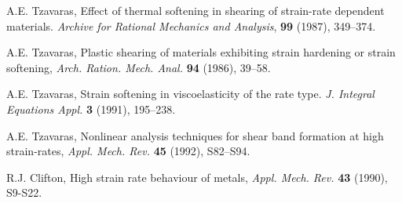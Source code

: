 \documentclass[a4paper,11pt]{article}
\begin{document}
\begin{thebibliography}{10}
{\sc A.E. Tzavaras}, 
Effect of thermal softening in shearing of strain-rate dependent materials.
{\em Archive for Rational Mechanics and Analysis}, {\bf 99} (1987), 349--374.

{\sc A.E. Tzavaras}, 
Plastic shearing of materials exhibiting strain hardening or strain softening, 
{\it Arch. Ration. Mech. Anal.}
{\bf 94} (1986), 39--58.

{\sc A.E. Tzavaras}, 
Strain softening in viscoelasticity of the rate type. 
{\it J. Integral Equations Appl.} {\bf  3}  (1991), 195--238.
  
{\sc A.E. Tzavaras}, 
Nonlinear analysis techniques for shear band formation at high strain-rates, 
{\it Appl. Mech. Rev.}
{\bf  45} (1992), S82--S94.



% 
% 
{\sc R.J. Clifton},  High strain rate behaviour of metals, 
{\it Appl. Mech. Rev.}
{\bf 43} (1990), S9-S22.
% 
% 
% 
% 
% 
% 


\end{thebibliography}
\end{document}
